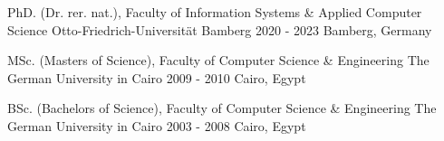 

\begin{cventries}

  \cventry
    {PhD. (Dr. rer. nat.), Faculty of Information Systems \& Applied Computer Science} %
    {Otto-Friedrich-Universit\"{a}t Bamberg} %
    {2020 - 2023} %
    {Bamberg, Germany} %
    {
    }

  \cventry
    {MSc. (Masters of Science), Faculty of Computer Science \& Engineering} %
    {The German University in Cairo} %
    {2009 - 2010} %
    {Cairo, Egypt} %
    {
    }

  \cventry
    {BSc. (Bachelors of Science), Faculty of Computer Science \& Engineering} %
    {The German University in Cairo} %
    {2003 - 2008} %
    {Cairo, Egypt} %
    {
    }


\end{cventries}
